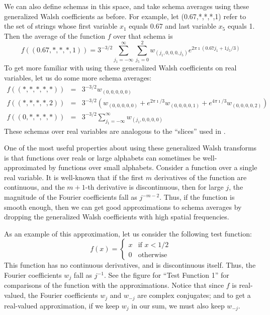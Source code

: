 We can also define schemas in this space, and take schema averages using
these generalized Walsh coefficients as before.  For example, let
(0.67,*,*,*,1) refer to the set of strings whose first variable $x_1$
equals 0.67 and last variable $x_5$ equals 1.  Then the average of the
function $f$ over that schema is
\begin{equation}
f((0.67,*,*,*,1))=3^{-3/2}\sum_{j_1=-\infty}^{\infty} {\sum_{j_5=0}^2{
	w_{(j_1,0,0,0,j_5)} e^{2 \pi \imath (0.67 j_1 + 1 j_5/3)}
}}
\end{equation}
To get more familiar with using these generalized Walsh coefficients on
real variables, let us do some more schema averages:
\begin{eqnarray}
f((*,*,*,*,*)) &=& 3^{-3/2} w_{(0,0,0,0,0)} \nonumber\\
f((*,*,*,*,2)) &=& 3^{-3/2} (w_{(0,0,0,0,0)} + 
	e^{2 \pi \imath/3} w_{(0,0,0,0,1)} + 
	e^{4 \pi \imath/3} w_{(0,0,0,0,2)}) \nonumber\\
f((0,*,*,*,*)) &=& 3^{-3/2} \sum_{j_1=-\infty}^{\infty}{w_{(j_1,0,0,0,0)}}
\end{eqnarray}
These schemas over real variables are analogous to the ``slices'' used
in \cite{real}.

One of the most useful properties about using these generalized Walsh
transforms is that functions over reals or large alphabets can sometimes
be well-approximated by functions over small alphabets.  
Consider a function over a single real variable.
It is well-known that
if the first $m$ derivatives of the function are continuous, and the $m+1$-th
derivative is discontinuous, then for large
$j$, the magnitude of the Fourier coefficients fall as $j^{-m-2}$.
Thus, if the function is smooth enough, then we can get good approximations
to schema averages by dropping the generalized Walsh coefficients with
high spatial frequencies.

As an example of this approximation, let us consider the following test
function:
\begin{equation}
f(x)= \left\{ \begin{array}{ll}
	x & \mbox{if $x<1/2$} \\
	0 & \mbox{otherwise}
	\end{array}
	\right.
\end{equation}
This function has no continuous derivatives, and is discontinuous itself.
Thus, the Fourier coefficients $w_j$ fall as $j^{-1}$.  See the figure
for ``Test Function 1'' for comparisons of the function with the approximations.
Notice that since $f$ is real-valued, the Fourier coefficients $w_j$ and
$w_{-j}$ are complex conjugates; and to get a real-valued approximation,
if we keep $w_j$ in our sum, we must also keep $w_{-j}$.

